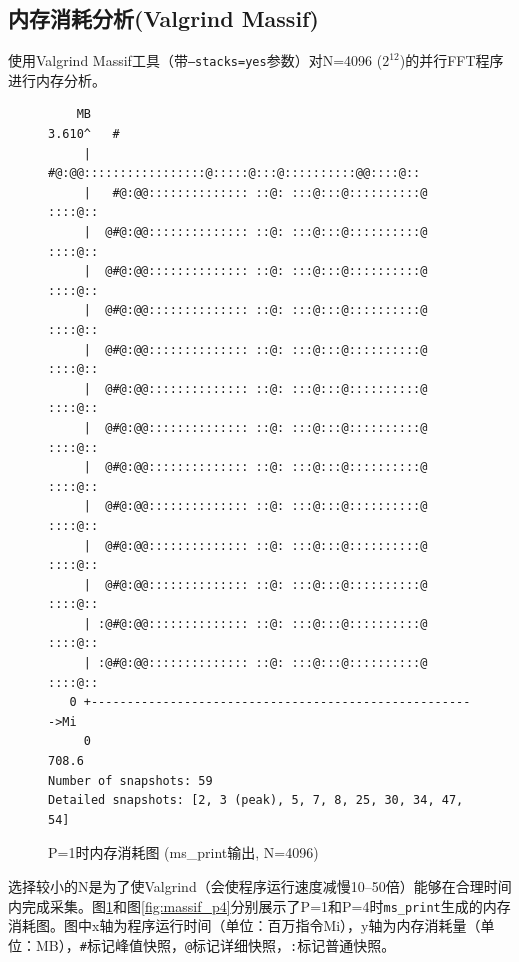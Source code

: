 \documentclass{SYSUReport}
\begin{document}
\subsection{内存消耗分析(Valgrind Massif)}

使用Valgrind Massif工具（带\texttt{--stacks=yes}参数）对N=4096 ($2^{12}$)的并行FFT程序进行内存分析。

\begin{figure}[h!]
\centering
\caption{P=1时内存消耗图 (ms\_print输出, N=4096)}
\label{fig:massif_p1}
\begin{verbatim}
    MB
3.610^   #
     |   #@:@@:::::::::::::::::@:::::@:::@::::::::::@@::::@::
     |   #@:@@:::::::::::::: ::@: :::@:::@::::::::::@ ::::@::
     |  @#@:@@:::::::::::::: ::@: :::@:::@::::::::::@ ::::@::
     |  @#@:@@:::::::::::::: ::@: :::@:::@::::::::::@ ::::@::
     |  @#@:@@:::::::::::::: ::@: :::@:::@::::::::::@ ::::@::
     |  @#@:@@:::::::::::::: ::@: :::@:::@::::::::::@ ::::@::
     |  @#@:@@:::::::::::::: ::@: :::@:::@::::::::::@ ::::@::
     |  @#@:@@:::::::::::::: ::@: :::@:::@::::::::::@ ::::@::
     |  @#@:@@:::::::::::::: ::@: :::@:::@::::::::::@ ::::@::
     |  @#@:@@:::::::::::::: ::@: :::@:::@::::::::::@ ::::@::
     |  @#@:@@:::::::::::::: ::@: :::@:::@::::::::::@ ::::@::
     |  @#@:@@:::::::::::::: ::@: :::@:::@::::::::::@ ::::@::
     | :@#@:@@:::::::::::::: ::@: :::@:::@::::::::::@ ::::@::
     | :@#@:@@:::::::::::::: ::@: :::@:::@::::::::::@ ::::@::
   0 +------------------------------------------------------>Mi
     0                                                  708.6
Number of snapshots: 59
Detailed snapshots: [2, 3 (peak), 5, 7, 8, 25, 30, 34, 47, 54]
\end{verbatim}
\end{figure}

选择较小的N是为了使Valgrind（会使程序运行速度减慢10--50倍）能够在合理时间内完成采集。图\ref{fig:massif_p1}和图\ref{fig:massif_p4}分别展示了P=1和P=4时\texttt{ms\_print}生成的内存消耗图。图中x轴为程序运行时间（单位：百万指令Mi），y轴为内存消耗量（单位：MB），\texttt{\#}标记峰值快照，\texttt{@}标记详细快照，\texttt{:}标记普通快照。
\end{document}
